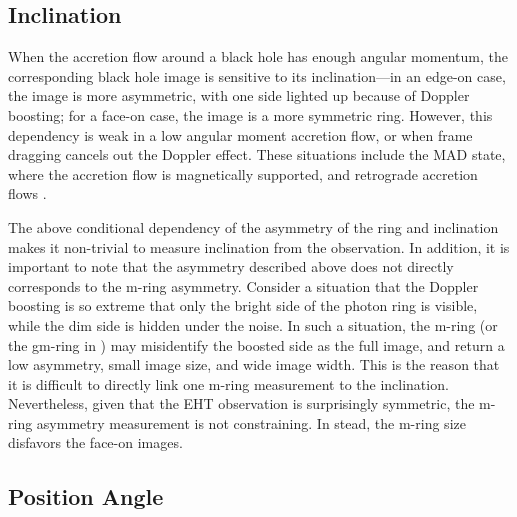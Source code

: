 \subsection{Inclination}


When the accretion flow around a black hole has enough angular momentum, the corresponding black hole image is sensitive to its inclination---in an edge-on case, the image is more asymmetric, with one side lighted up because of Doppler boosting; for a face-on case, the image is a more symmetric ring.
However, this dependency is weak in a low angular moment accretion flow, or when frame dragging cancels out the Doppler effect. These situations include the MAD state, where the accretion flow is magnetically supported, and retrograde accretion flows \citep{2021arXiv210503424M}.

The above conditional dependency of the asymmetry of the ring and
inclination makes it non-trivial to measure inclination from the
observation.
In addition, it is important to note that the asymmetry described
above does not directly corresponds to the m-ring asymmetry.
Consider a situation that the Doppler boosting is so extreme that only
the bright side of the photon ring is visible, while the dim side is
hidden under the noise.
In such a situation, the m-ring (or the gm-ring in )
may misidentify the boosted side as the full image, and return a low
asymmetry, small image size, and wide image width.
This is the reason that it is difficult to directly link one m-ring
measurement to the inclination.
Nevertheless, given that the EHT observation is surprisingly
symmetric, the m-ring asymmetry measurement is not constraining.
In stead, the m-ring size disfavors the face-on images.

\subsection{Position Angle}

